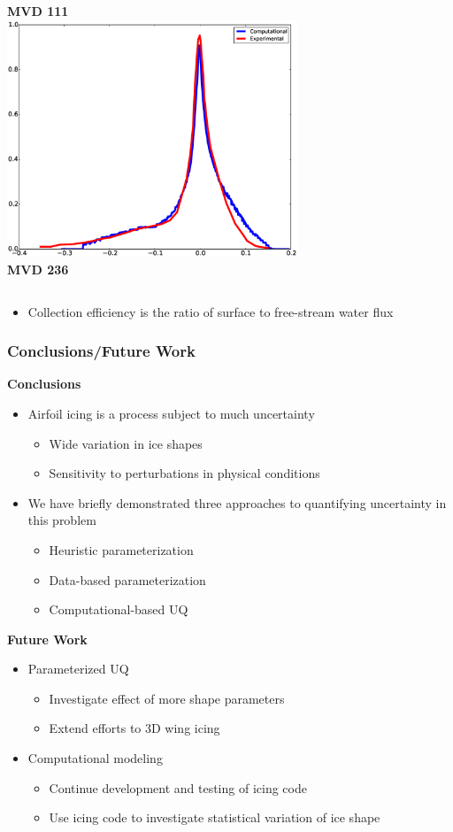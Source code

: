 \documentclass[9pt]{beamer}
\begin{document}
\begin{frame}
\begin{columns}[c]
    {\bf MVD 111} \\
    \includegraphics[width=0.65\textwidth]{MVD236} \\
    {\bf MVD 236}
\end{columns}

\begin{itemize}
\item Collection efficiency is the ratio of surface to free-stream water flux
\end{itemize}
\end{frame}
\begin{frame}
\frametitle{Conclusions/Future Work}
\label{sec-5-7}


\textbf{Conclusions}
\begin{itemize}
\item Airfoil icing is a process subject to much uncertainty
\begin{itemize}
\item Wide variation in ice shapes
\item Sensitivity to perturbations in physical conditions
\end{itemize}
\item We have briefly demonstrated three approaches to quantifying
  uncertainty in this problem
\begin{itemize}
\item Heuristic parameterization
\item Data-based parameterization
\item Computational-based UQ
\end{itemize}
\end{itemize}
\textbf{Future Work}
\begin{itemize}
\item Parameterized UQ
\begin{itemize}
\item Investigate effect of more shape parameters
\item Extend efforts to 3D wing icing
\end{itemize}
\item Computational modeling
\begin{itemize}
\item Continue development and testing of icing code
\item Use icing code to investigate statistical variation of ice shape
\end{itemize}
\end{itemize}
\end{frame}
\end{document}
